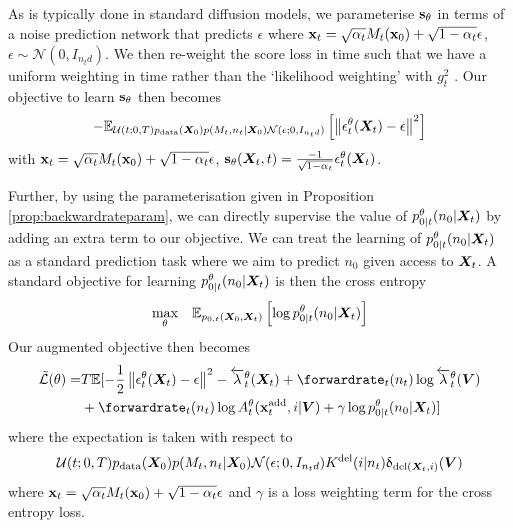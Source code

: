As is typically done in standard diffusion models, we parameterise ${\mathbf{s}}_\theta$ in terms of a noise prediction network that predicts $\epsilon$ where ${\mathbf{x}}_t = \sqrt{\alpha_t}M_t({\mathbf{x}}_0) + \sqrt{1- \alpha_t} \epsilon$, $\epsilon \sim \mathcal{N}(0, I_{n_t d})$. We then re-weight the score loss in time such that we have a uniform weighting in time rather than the `likelihood weighting' with $g_t^2$ \citet{song2020score, song2021maximum}. Our objective to learn ${\mathbf{s}}_\theta$ then becomes
\begin{equation}
    - \mathbb{E}_{\mathcal{U}(t; 0, T) p_{\rm{data}}({\bm{X}}_0) p(M_t, n_t | {\bm{X}}_0) \mathcal{N}(\epsilon; 0, I_{n_t d})} \left[ \left\lVert\epsilon_t^\theta({\bm{X}}_t) - \epsilon\right\rVert^2 \right]
\end{equation}
with ${\mathbf{x}}_t = \sqrt{\alpha_t} M_t({\mathbf{x}}_0) + \sqrt{1 - \alpha_t} \epsilon$, ${\mathbf{s}}_\theta({\bm{X}}_t, t) = \frac{-1}{\sqrt{1-\alpha_t}} \epsilon_t^\theta({\bm{X}}_t)$.

Further, by using the parameterisation given in Proposition \ref{prop:backwardrateparam}, we can directly supervise the value of $p_{0|t}^\theta(n_0 | {\bm{X}}_t)$ by adding an extra term to our objective. We can treat the learning of $p_{0|t}^\theta(n_0 | {\bm{X}}_t)$ as a standard prediction task where we aim to predict $n_0$ given access to ${\bm{X}}_t$. A standard objective for learning $p_{0|t}^\theta(n_0 | {\bm{X}}_t)$ is then the cross entropy
\begin{equation}
    \underset{\theta}{\text{max}} \quad \mathbb{E}_{p_{0,t}({\bm{X}}_0, {\bm{X}}_t)} \left[ \log p_{0|t}^{\theta}(n_0 | {\bm{X}}_t) \right] 
\end{equation}
Our augmented objective then becomes
\begin{align} \label{eq:augmentedObjective}
    \tilde{\mathcal{L}}(\theta) = &T\mathbb{E} [ -\frac{1}{2}\norm{\epsilon_t^\theta(\mX_t) - \epsilon}^2 - \backwardrate_t^\theta(\mX_t) + \forwardrate_t(n_t) \log \backwardrate_t^\theta(\mV) \\ 
    &+ \forwardrate_t(n_t) \log \autonet_t^\theta(\xadd_t, i | \mV) + \gamma \log p_{0|t}^\theta (n_0 | \mX_t) ] \nonumber
\end{align}
where the expectation is taken with respect to 
\begin{equation}
\mathcal{U}(t; 0, T) p_{\rm{data}}({\bm{X}}_0) p(M_t, n_t | {\bm{X}}_0) \mathcal{N}(\epsilon; 0, I_{n_t d}) K^{\textup{del}}(i | n_t) \updelta_{\text{del}({\bm{X}}_t, i)}({\bm{V}})
\end{equation}
where ${\mathbf{x}}_t = \sqrt{\alpha_t} M_t({\mathbf{x}}_0) + \sqrt{1 - \alpha_t} \epsilon$ and $\gamma$ is a loss weighting term for the cross entropy loss.


